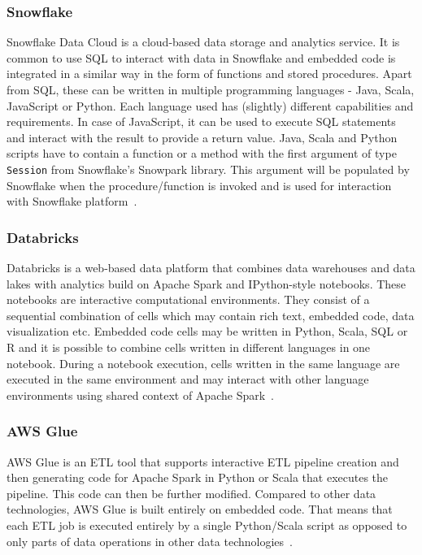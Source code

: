 \subsubsection{Snowflake}
Snowflake Data Cloud is a cloud-based data storage and analytics service. It is common to use SQL to interact with data in Snowflake and embedded code is integrated in a similar way in the form of functions and stored procedures. Apart from SQL, these can be written in multiple programming languages - Java, Scala, JavaScript or Python. Each language used has (slightly) different capabilities and requirements. In case of JavaScript, it can be used to execute SQL statements and interact with the result to provide a return value. Java, Scala and Python scripts have to contain a function or a method with the first argument of type \texttt{Session} from Snowflake's Snowpark library. This argument will be populated by Snowflake when the procedure/function is invoked and is used for interaction with Snowflake platform~\cite{snowflake}.

\subsubsection{Databricks}
Databricks is a web-based data platform that combines data warehouses and data lakes with analytics build on Apache Spark and IPython-style notebooks. These notebooks are interactive computational environments. They consist of a sequential combination of cells which may contain rich text, embedded code, data visualization etc. Embedded code cells may be written in Python, Scala, SQL or R and it is possible to combine cells written in different languages in one notebook. During a notebook execution, cells written in the same language are executed in the same environment and may interact with other language environments using shared context of Apache Spark~\cite{databricks}.

\subsubsection{AWS Glue}
AWS Glue is an ETL tool that supports interactive ETL pipeline creation and then generating code for Apache Spark in Python or Scala that executes the pipeline. This code can then be further modified. Compared to other data technologies, AWS Glue is built entirely on embedded code. That means that each ETL job is executed entirely by a single Python/Scala script as opposed to only parts of data operations in other data technologies~\cite{awsglueintro}. 

